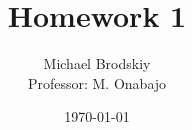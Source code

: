 


\title{Homework 1}
\date{\today}
\author{Michael Brodskiy\\ \small Professor: M. Onabajo}



\maketitle

